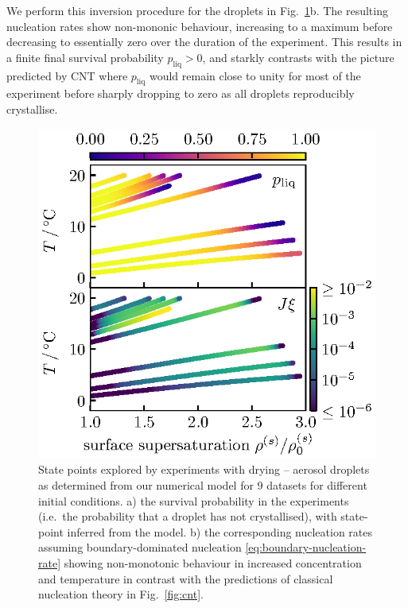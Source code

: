 \documentclass[11pt,twoside]{report}
\begin{document}
We perform this inversion procedure for the  droplets in Fig.\ \ref{fig:state-points}b.
The resulting nucleation rates show non-mononic behaviour, increasing to a maximum before decreasing to essentially zero over the duration of the experiment.
This results in a finite final survival probability $p_\mathrm{liq} > 0$, and starkly contrasts with the picture predicted by CNT where $p_\mathrm{liq}$ would remain close to unity for most of the experiment before sharply dropping to zero as all droplets reproducibly crystallise.

\begin{figure}
  \includegraphics[width=0.9\linewidth,outer]{nano3-nucleation-rates}
  \caption[Experimentally observed nucleation rates in  droplets]{
    State points explored by experiments with drying -- aerosol droplets as determined from our numerical model for 9 datasets for different initial conditions.
    a) the survival probability in the experiments (i.e.\ the probability that a droplet has not crystallised), with state-point inferred from the model.
    b) the corresponding nucleation rates assuming boundary-dominated nucleation \eqref{eq:boundary-nucleation-rate} showing non-monotonic behaviour in increased concentration and temperature in contrast with the predictions of classical nucleation theory in Fig.\ \ref{fig:cnt}.}
  \label{fig:state-points}
\end{figure}
\end{document}
